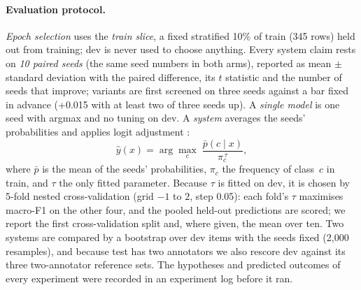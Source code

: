 \paragraph{Evaluation protocol.}
\emph{Epoch selection} uses the \emph{train slice}, a fixed stratified 10\% of train (345 rows) held out from training; dev is never used to choose anything.
Every system claim rests on \emph{10 paired seeds} (the same seed numbers in both arms), reported as mean $\pm$ standard deviation with the paired difference, its $t$ statistic and the number of seeds that improve; variants are first screened on three seeds against a bar fixed in advance (+0.015 with at least two of three seeds up).
A \emph{single model} is one seed with argmax and no tuning on dev.
A \emph{system} averages the seeds' probabilities and applies logit adjustment \citep{menon2021longtail}:
\begin{equation}
  \hat{y}(x) = \arg\max_{c}\; \frac{\bar{p}(c \mid x)}{\pi_c^{\,\tau}},
  \label{eq:la}
\end{equation}
where $\bar{p}$ is the mean of the seeds' probabilities, $\pi_c$ the frequency of class~$c$ in train, and $\tau$ the only fitted parameter.
Because $\tau$ is fitted on dev, it is chosen by 5-fold nested cross-validation (grid $-1$ to $2$, step 0.05): each fold's $\tau$ maximises \Stwo{} macro-F1 on the other four, and the pooled held-out predictions are scored; we report the first cross-validation split and, where given, the mean over ten.
Two systems are compared by a bootstrap over dev items with the seeds fixed (2,000 resamples), and because test has two annotators we also rescore dev against its three two-annotator reference sets.
The hypotheses and predicted outcomes of every experiment were recorded in an experiment log before it ran.
